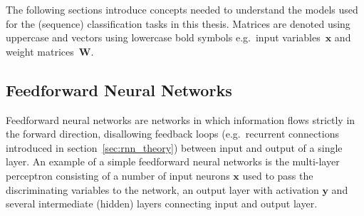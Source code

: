 The following sections introduce concepts needed to understand the models used
for the (sequence) classification tasks in this thesis. Matrices are denoted
using uppercase and vectors using lowercase bold symbols e.g.\ input
variables~$\mathbf{x}$ and weight matrices~$\mathbf{W}$.

\subsection{Feedforward Neural Networks}
\label{sec:nn_feedforward}
Feedforward neural networks are networks in which information flows strictly in
the forward direction, disallowing feedback loops (e.g.\ recurrent connections
introduced in section~\ref{sec:rnn_theory}) between input and output of a single
layer. An example of a simple feedforward neural networks is the multi-layer
perceptron consisting of a number of input neurons $\mathbf{x}$ used to pass the
discriminating variables to the network, an output layer with activation
$\mathbf{y}$ and several intermediate (hidden) layers connecting input and
output layer.
